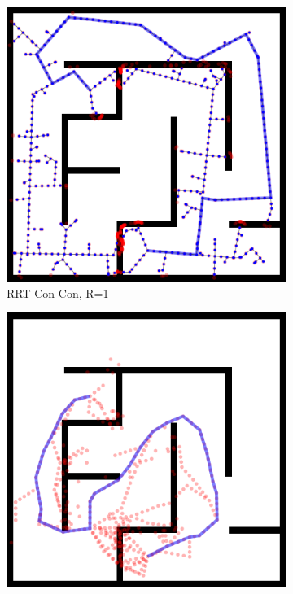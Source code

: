 \documentclass{report}
\begin{document}
\begin{figure}
\begin{subfigure}[b]{0.3\textwidth}
\includegraphics[width=\textwidth]{figs/compare-2d-rrtc1-rrtconcon-r1-s1.png}
\caption{RRT Con-Con, R=1}
\end{subfigure}%
\quad
\begin{subfigure}[b]{0.3\textwidth}
\includegraphics[width=\textwidth]{figs/compare-2d-rrtc1-checkmask-l00-s1.png}

\end{subfigure}
\end{figure}
\end{document}
